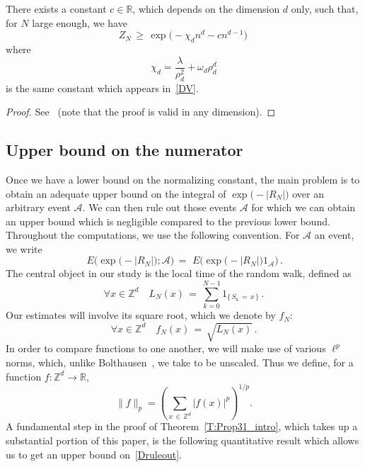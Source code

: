 \documentclass[AHL, Unicode, longabstracts, published]{cedram}
\newcommand*\Z {{\mathbb Z}}
\newcommand*\Zd {{\mathbb Z^d}}
\newcommand*\R{\mathbb{R}}
\newcommand{\cA}{\mathcal{A}}
\let\oldforall\forall
\renewcommand*{\forall}{\mathrel{\oldforall}}
\begin{document}
\begin{prop}\label{P:lbZ}
There exists a constant $c \in \R$, which depends on the dimension $d$ only, such that, for $N$ large enough, we have
\[
Z_N\,\geq\,\exp\Big(-\chi_d n^{{d}}-cn^{{d-1}}\Big)\,
\]
where
\[
\chi_d = \frac{\lambda}{\rho_d^2} + \omega_d \rho_d^d
\]
is the same constant which appears in~\eqref{DV}.
\end{prop}



\begin{proof}
See~\cite[Proposition~2.1]{BO} (note that the proof is valid in any dimension).
\end{proof}



\subsection{Upper bound on the numerator} Once we have a lower bound on the normalizing constant, the main problem is to obtain an adequate upper bound on the integral of $\exp\big(-|R_N|\big)$ over an arbitrary event $\cA$. We can then rule out those events $\cA$ for which we can obtain an upper bound which is negligible compared to the previous lower bound. Throughout the computations, we use the following convention. For $\cA$ an event, we write
\begin{equation}\label{Druleout}
\,E\Big(\exp\big(-|R_N|\big); \cA\Big)\,=\,
\,E\Big(\exp\big(-|R_N|\big)1_\cA\Big)
\,.
\end{equation}
The central object in our study is the local time of the random walk, defined as
\begin{equation}\label{D:localtimes}
\forall x\in\Zd\quad L_N(x)\,=\,
\sum_{k=0}^{N-1}1_{\{\,S_k\,=\,x\,\}}\,.
\end{equation}
Our estimates will involve its square root, which we denote by $f_N$:
\begin{equation}\label{D:fN}
\forall x\in\Zd\quad f_N(x)\,=\,\sqrt{L_N(x)}\,.
\end{equation}
In order to compare functions to one another, we will make use of various $\ell^p$ norms, which, unlike Bolthausen~\cite{BO}, we take to be unscaled. Thus we define, for a function $f : \Z^d \to \R$,
\begin{equation}\label{D:lp}
\|f \|_p = \left(\sum_{x\,\in\,\Z^d} | f(x)|^p \right)^{1/p}.
\end{equation}
A fundamental step in the proof of Theorem~\ref{T:Prop31_intro}, which takes up a substantial portion of this paper, is the following quantitative result which allows us to get an upper bound on~\eqref{Druleout}.
\end{document}
